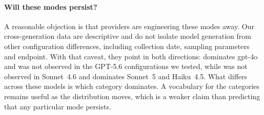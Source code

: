 \paragraph{Will these modes persist?}
A reasonable objection is that providers are engineering these modes
away. Our cross-generation data are descriptive and do not isolate model
generation from other configuration differences, including collection
date, sampling parameters and endpoint. With that caveat, they point in
both directions:  dominates gpt-4o and was not
observed in the GPT-5.6 configurations we tested, while
 was not observed in Sonnet~4.6 and dominates
Sonnet~5 and Haiku~4.5. What differs across these models is which
category dominates. A vocabulary for the categories remains useful as the
distribution moves, which is a weaker claim than predicting that any
particular mode persists.
